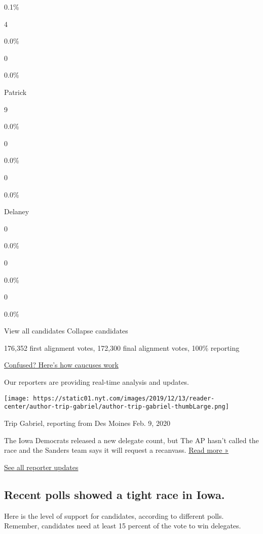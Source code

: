 0.1\%

4

0.0\%

0

0.0\%

 Patrick

9

0.0\%

0

0.0\%

0

0.0\%

 Delaney

0

0.0\%

0

0.0\%

0

0.0\%

View all candidates Collapse candidates

176,352 first alignment votes, 172,300 final alignment votes, 100\%
reporting

\href{https://www.nytimes.com/interactive/2020/02/20/us/politics/how-nevada-caucuses-work.html}{Confused?
Here's how caucuses work}

Our reporters are providing real-time analysis and updates.

\texttt{[image: https://static01.nyt.com/images/2019/12/13/reader-center/author-trip-gabriel/author-trip-gabriel-thumbLarge.png]}

Trip Gabriel, reporting from Des Moines Feb. 9, 2020

The Iowa Democrats released a new delegate count, but The AP hasn't
called the race and the Sanders team says it will request a recanvass.
\href{https://www.nytimes.com/2020/02/09/us/politics/iowa-caucuses-democrats.html?action=click\&module=ELEX_results\&pgtype=Interactive\&region=ReporterUpdates}{Read
more »}

\href{https://www.nytimes.com/interactive/2020/02/03/us/elections/results-iowa-caucus-live-updates.html?action=click\&module=ELEX_results\&pgtype=Interactive\&region=Component}{See
all reporter updates}

\hypertarget{recent-polls-showed-a-tight-race-in-iowa}{%
\subsection{Recent polls showed a tight race in
Iowa.}\label{recent-polls-showed-a-tight-race-in-iowa}}

Here is the level of support for candidates, according to different
polls. Remember, candidates need at least 15 percent of the vote to win
delegates.

